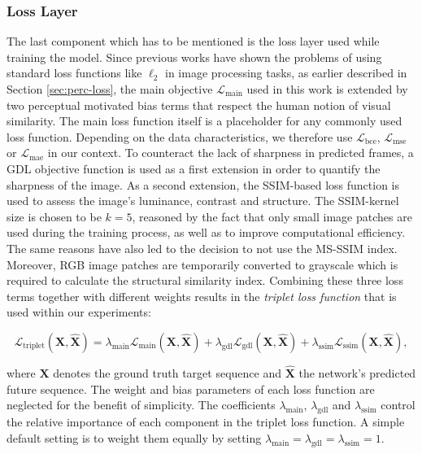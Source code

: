 \subsubsection{Loss Layer}

The last component which has to be mentioned is the loss layer used while training the model. Since previous works have shown the problems of using standard loss functions like $\ell_2$ in image processing tasks, as earlier described in Section \ref{sec:perc-loss}, the main objective $\mathcal{L}_{\textrm{main}}$ used in this work is extended by two perceptual motivated bias terms that respect the human notion of visual similarity. The main loss function itself is a placeholder for any commonly used loss function. Depending on the data characteristics, we therefore use $\mathcal{L}_{\textrm{bce}}$, $\mathcal{L}_{\textrm{mse}}$ or $\mathcal{L}_{\textrm{mae}}$ in our context. To counteract the lack of sharpness in predicted frames, a GDL objective function is used as a first extension in order to quantify the sharpness of the image. As a second extension, the SSIM-based loss function is used to assess the image's luminance, contrast and structure. The SSIM-kernel size is chosen to be $k=5$, reasoned by the fact that only small image patches are used during the training process, as well as to improve computational efficiency. The same reasons have also led to the decision to not use the MS-SSIM index. Moreover, RGB image patches are temporarily converted to grayscale which is required to calculate the structural similarity index. Combining these three loss terms together with different weights results in the \textit{triplet loss function} that is used within our experiments:

\begin{equation} \label{eq:triplet}
\mathcal{L}_{\textrm{triplet}}(\textbf{X}, \hat{\textbf{X}}) = \lambda_{\textrm{main}} \mathcal{L}_{\textrm{main}}(\textbf{X}, \hat{\textbf{X}}) + \lambda_{\textrm{gdl}} \mathcal{L}_{\textrm{gdl}}(\textbf{X}, \hat{\textbf{X}}) + \lambda_{\textrm{ssim}} \mathcal{L}_{\textrm{ssim}}(\textbf{X}, \hat{\textbf{X}}) ,
\end{equation}

where $ \textbf{X} $ denotes the ground truth target sequence and $ \hat{\textbf{X}} $ the network's predicted future sequence. The weight and bias parameters of each loss function are neglected for the benefit of simplicity. The coefficients $\lambda_{\textrm{main}}$, $\lambda_{\textrm{gdl}}$ and $\lambda_{\textrm{ssim}}$ control the relative importance of each component in the triplet loss function. A simple default setting is to weight them equally by setting $\lambda_{\textrm{main}} = \lambda_{\textrm{gdl}} = \lambda_{\textrm{ssim}} = 1$.

